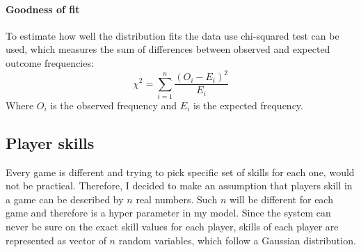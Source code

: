 \documentclass[12pt,a4paper]{book}
\begin{document}
\paragraph{Goodness of fit}
To estimate how well the distribution fits the data use chi-squared test can be used, which measures the sum of differences between observed and expected outcome frequencies:
\begin{equation*}
\chi^2 = \sum_{i=1}^{n} \frac{(O_i - E_i)^2}{E_i}
\end{equation*}
Where $O_i$ is the observed frequency and $E_i$ is the expected frequency.
\subsection{Player skills}
Every game is different and trying to pick specific set of skills for each one, would not be practical.
Therefore, I decided to make an assumption that players skill in a game can be described by $n$ real numbers.
Such $n$ will be different for each game and therefore is a hyper parameter in my model.
Since the system can never be sure on the exact skill values for each player, skills of each player are represented as vector of $n$ random variables, which follow a Gaussian distribution.
\end{document}
